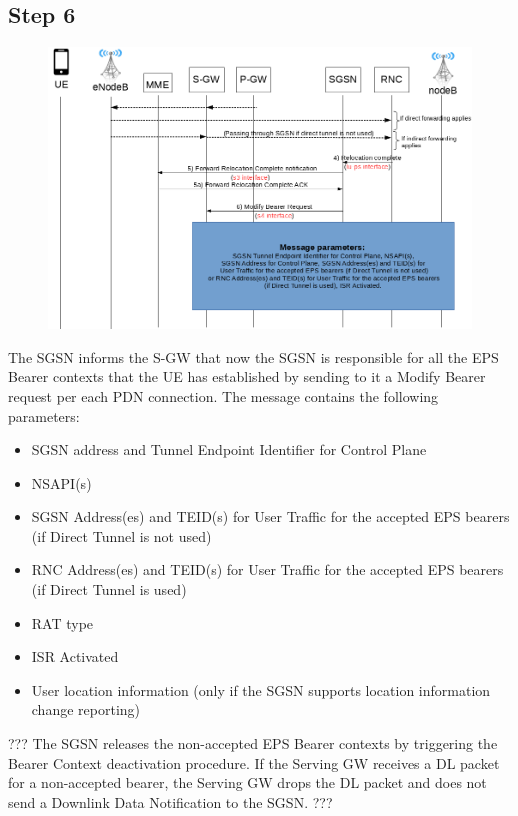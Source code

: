 \subsection*{Step 6}
\begin{figure}[!htb]
	\centering
	\includegraphics[width=0.9\linewidth]{img/execution-6.png}
	\label{fig:exec-6}
\end{figure}
The SGSN informs the S-GW that now the SGSN is responsible for all the EPS Bearer
contexts that the UE has established by sending to it a Modify Bearer request per
each PDN connection. The message contains the following parameters:
\begin{itemize}
	\item SGSN address and Tunnel Endpoint Identifier for Control Plane
	\item NSAPI(s)
	\item SGSN Address(es) and TEID(s) for User Traffic for the accepted EPS bearers
	(if Direct Tunnel is not used)
	\item RNC Address(es) and TEID(s) for User Traffic for the accepted EPS bearers
	(if Direct Tunnel is used)
	\item RAT type
	\item ISR Activated
	\item User location information (only if the SGSN supports location information
	change reporting)
\end{itemize}
??? The SGSN releases the non-accepted EPS Bearer contexts by triggering the Bearer Context deactivation
procedure. If the Serving GW receives a DL packet for a non-accepted bearer, the Serving GW drops the DL
packet and does not send a Downlink Data Notification to the SGSN. ???




